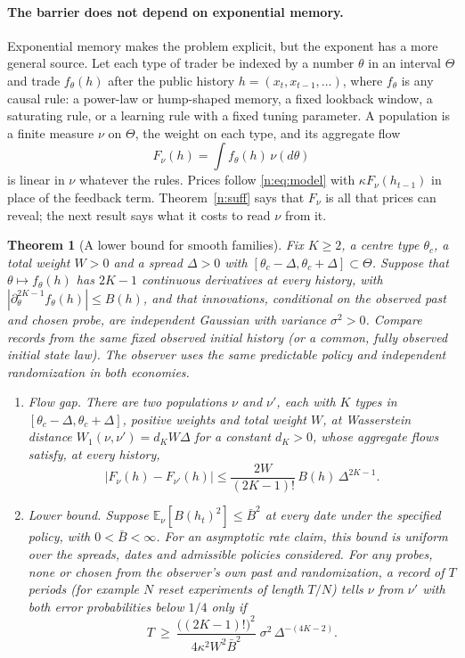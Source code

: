 \documentclass[12pt]{article}
\newtheorem{theorem}{Theorem}[section]
\theoremstyle{definition}
\theoremstyle{remark}
\begin{document}
\paragraph{The barrier does not depend on exponential memory.} Exponential memory makes the problem explicit, but the exponent has a more general source. Let each type of trader be indexed by a number $\theta$ in an interval $\Theta$ and trade $f_\theta(h)$ after the public history $h=(x_t,x_{t-1},\ldots)$, where $f_\theta$ is any causal rule: a power-law or hump-shaped memory, a fixed lookback window, a saturating rule, or a learning rule with a fixed tuning parameter. A population is a finite measure $\nu$ on $\Theta$, the weight on each type, and its aggregate flow
\[
F_\nu(h)=\int f_\theta(h)\,\nu(d\theta)
\]
is linear in $\nu$ whatever the rules. Prices follow \eqref{n:eq:model} with $\kappa F_\nu(h_{t-1})$ in place of the feedback term. Theorem~\ref{n:suff} says that $F_\nu$ is all that prices can reveal; the next result says what it costs to read $\nu$ from it.

\begin{theorem}[A lower bound for smooth families]\label{n:univ}
Fix $K\ge2$, a centre type $\theta_c$, a total weight $W>0$ and a spread $\Delta>0$ with $[\theta_c-\Delta,\theta_c+\Delta]\subset\Theta$. Suppose that $\theta\mapsto f_\theta(h)$ has $2K-1$ continuous derivatives at every history, with $|\partial_\theta^{2K-1}f_\theta(h)|\le B(h)$, and that innovations, conditional on the observed past and chosen probe, are independent Gaussian with variance $\sigma^2>0$. Compare records from the same fixed observed initial history (or a common, fully observed initial state law). The observer uses the same predictable policy and independent randomization in both economies.
\begin{enumerate}[label=(\roman*),itemsep=1pt]
\item \emph{Flow gap.} There are two populations $\nu$ and $\nu'$, each with $K$ types in $[\theta_c-\Delta,\theta_c+\Delta]$, positive weights and total weight $W$, at Wasserstein distance $W_1(\nu,\nu')=d_KW\Delta$ for a constant $d_K>0$, whose aggregate flows satisfy, at every history,
\[
|F_\nu(h)-F_{\nu'}(h)|\le\frac{2W}{(2K-1)!}\,B(h)\,\Delta^{2K-1}.
\]
\item \emph{Lower bound.} Suppose $\mathbb E_\nu[B(h_t)^2]\le\bar B^2$ at every date under the specified policy, with $0<\bar B<\infty$. For an asymptotic rate claim, this bound is uniform over the spreads, dates and admissible policies considered. For any probes, none or chosen from the observer's own past and randomization, a record of $T$ periods (for example $N$ reset experiments of length $T/N$) tells $\nu$ from $\nu'$ with both error probabilities below $1/4$ only if
\[
T\ \ge\ \frac{\big((2K-1)!\big)^2}{4\kappa^2W^2\bar B^2}\;\sigma^2\,\Delta^{-(4K-2)}.
\]
\end{enumerate}
\end{theorem}
\end{document}
